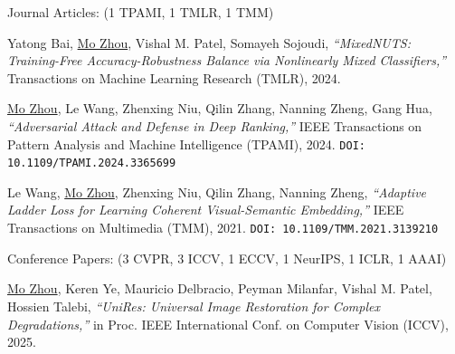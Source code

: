 \documentclass[10pt,margin,line,pifont,palatino,courier]{res}
\begin{document}
\begin{resume}
{\sc Journal Articles:} \hfill(1 TPAMI, 1 TMLR, 1 TMM)\\

\begin{enumerate}[noitemsep, leftmargin=*, label={[J0{\arabic*}]}]

\item Yatong Bai, \underline{Mo Zhou}, Vishal M. Patel, Somayeh Sojoudi,
\reversemarginpar{}
\textit{``MixedNUTS: Training-Free Accuracy-Robustness Balance via Nonlinearly Mixed Classifiers,''}
Transactions on Machine Learning Research (TMLR), 2024.

\item \underline{Mo Zhou},
\reversemarginpar{}
Le Wang, Zhenxing Niu, Qilin Zhang, Nanning Zheng, Gang Hua,
\textit{``Adversarial Attack and Defense in Deep Ranking,''}
IEEE Transactions on Pattern Analysis and Machine Intelligence (TPAMI), 2024.
\texttt{\small DOI: 10.1109/TPAMI.2024.3365699}

\item Le Wang, \underline{Mo Zhou},
\reversemarginpar{}
Zhenxing Niu, Qilin Zhang, Nanning Zheng,
\textit{``Adaptive Ladder Loss for Learning Coherent Visual-Semantic Embedding,''}
IEEE Transactions on Multimedia (TMM), 2021.
\texttt{\small DOI: 10.1109/TMM.2021.3139210}

\end{enumerate}

    {\sc Conference Papers:}\hfill
    (3 CVPR, 3 ICCV, 1 ECCV, 1 NeurIPS, 1 ICLR, 1 AAAI)\\

\begin{enumerate}[noitemsep, leftmargin=*, label={[C{\arabic*}]}]

\item \underline{Mo Zhou}, Keren Ye, Mauricio Delbracio, Peyman Milanfar,
\reversemarginpar{}
Vishal M. Patel, Hossien Talebi,
\textit{``UniRes: Universal Image Restoration for Complex Degradations,''}
in Proc. IEEE International Conf. on Computer Vision (ICCV), 2025.


\end{enumerate}
\end{resume}
\end{document}
